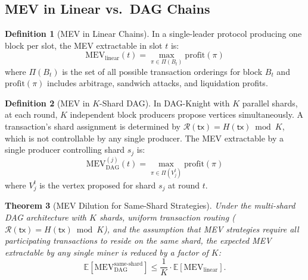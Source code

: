 \documentclass[11pt,a4paper]{article}
\newtheorem{theorem}{Theorem}[section]
\theoremstyle{definition}
\newtheorem{definition}[theorem]{Definition}
\theoremstyle{remark}
\newcommand{\DK}{\textsf{DAG-Knight}}
\newcommand{\expect}{\mathbb{E}}
\begin{document}
\subsection{MEV in Linear vs.\ DAG Chains}

\begin{definition}[MEV in Linear Chains]\label{def:mev-linear}
In a single-leader protocol producing one block per slot, the
MEV extractable in slot $t$ is:
\[
  \mathrm{MEV}_{\text{linear}}(t) = \max_{\pi \in \Pi(B_t)}
    \mathrm{profit}(\pi)
\]
where $\Pi(B_t)$ is the set of all possible transaction orderings
for block $B_t$ and $\mathrm{profit}(\pi)$ includes arbitrage,
sandwich attacks, and liquidation profits.
\end{definition}

\begin{definition}[MEV in $K$-Shard DAG]\label{def:mev-dag}
In \DK{} with $K$ parallel shards, at each round, $K$ independent
block producers propose vertices simultaneously.
A transaction's shard assignment is determined by
$\mathcal{R}(\mathsf{tx}) = H(\mathsf{tx}) \bmod K$, which is
not controllable by any single producer.
The MEV extractable by a single producer controlling shard $s_j$ is:
\[
  \mathrm{MEV}_{\text{DAG}}^{(j)}(t) = \max_{\pi \in \Pi(V_j^t)}
    \mathrm{profit}(\pi)
\]
where $V_j^t$ is the vertex proposed for shard $s_j$ at round $t$.
\end{definition}

\begin{theorem}[MEV Dilution for Same-Shard Strategies]\label{thm:mev}
Under the multi-shard DAG architecture with $K$ shards, uniform
transaction routing ($\mathcal{R}(\mathsf{tx}) = H(\mathsf{tx}) \bmod K$),
and the assumption that MEV strategies require all participating
transactions to reside on the same shard, the expected MEV extractable
by any single miner is reduced by a factor of $K$:
\[
  \expect[\mathrm{MEV}_{\text{DAG}}^{\text{same-shard}}] \leq
  \frac{1}{K} \cdot \expect[\mathrm{MEV}_{\text{linear}}].
\]
\end{theorem}
\end{document}
